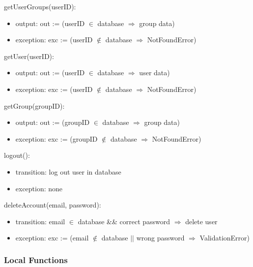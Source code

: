 \documentclass[12pt, titlepage]{article}
\begin{document}
\noindent getUserGroups(userID):
\begin{itemize}
\item output: out := (userID $\in$ database $\Rightarrow$ group data)
\item exception: exc := (userID $\notin$ database $\Rightarrow$ NotFoundError)
\end{itemize}

\noindent getUser(userID):
\begin{itemize}
\item output: out := (userID $\in$ database $\Rightarrow$ user data)
\item exception: exc := (userID $\notin$ database $\Rightarrow$ NotFoundError)
\end{itemize}

\noindent getGroup(groupID):
\begin{itemize}
\item output: out := (groupID $\in$ database $\Rightarrow$ group data)
\item exception: exc := (groupID $\notin$ database $\Rightarrow$ NotFoundError)
\end{itemize}

\noindent logout():
\begin{itemize}
\item transition: log out user in database
\item exception: none
\end{itemize}

\noindent deleteAccount(email, password):
\begin{itemize}
\item transition: email $\in$ database \&\& correct password $\Rightarrow$ delete user
\item exception: exc := (email $\notin$ database $\vert\vert$ wrong password $\Rightarrow$ ValidationError)
\end{itemize}



\subsubsection{Local Functions}
\end{document}
